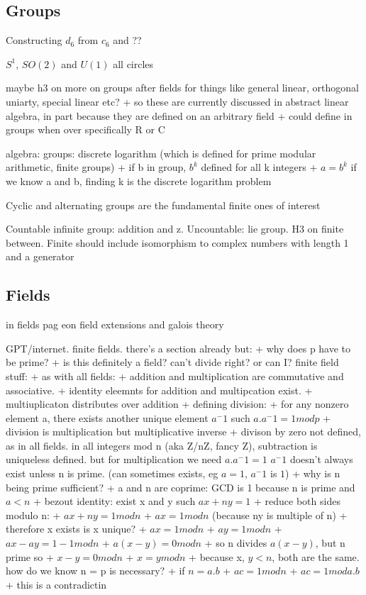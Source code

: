 
\subsection{Groups}
Constructing \(d_6\) from \(c_6\) and ??

\(S^1\), \(SO(2)\) and \(U(1)\) all circles


maybe h3 on more on groups after fields for things like general linear, orthogonal uniarty, special linear etc?
+ so these are currently discussed in abstract linear algebra, in part because they are defined on an arbitrary field
+ could define in groups when over specifically R or C

algebra: groups: discrete logarithm (which is defined for prime modular arithmetic, finite groups)
+ if b in group, \(b^k\) defined for all k integers
+ \(a = b^k\)
if we know a and b, finding k is the discrete logarithm problem

Cyclic and alternating groups are the fundamental finite ones of interest

Countable infinite group: addition and z. Uncountable: lie group.
H3 on finite between. Finite should include isomorphism to complex numbers with length 1 and a generator

\subsection{Fields}
in fields
	pag eon field extensions and galois theory

GPT/internet. finite fields. there's a section already but:
+ why does p have to be prime?
+ is this definitely a field? can't divide right? or can I?
finite field stuff:
+ as with all fields:
+ addition and multiplication are commutative and associative.
+ identity eleemnts for addition and multipcation exist.
+ multiuplicaton distributes over addition
+ defining division:
+ for any nonzero element a, there exists another unique element \(a^-1\) such \(a.a^-1 = 1 mod p\)
+ division is multiplication but multiplicative inverse
+ divison by zero not defined, as in all fields.
in all integers mod n (aka Z/nZ, fancy Z), subtraction is uniqueless defined.
but for multiplication we need \(a.a^-1=1\)
\(a^-1\) doesn't always exist unless n is prime. (can sometimes exists, eg \(a=1\), \(a^-1\) is \(1\))
+ why is n being prime sufficient?
+ a and n are coprime: GCD is 1 because n is prime and \(a < n\)
+ bezout identity: exist x and y such \(ax+ny=1\)
+ reduce both sides modulo n:
+ \(ax+ny=1 mod n\)
+ \(ax = 1 mod n\) (because ny is multiple of n)
+ therefore x exists
is x unique?
+ \(ax=1 mod n\)
+ \(ay=1 mod n\)
+ \(ax-ay=1-1 mod n\)
+ \(a(x-y)= 0 mod n\)
+ so n divides \(a(x-y)\), but n prime so
+ \(x-y = 0 mod n\)
+ \(x=y mod n\)
+ because x, \(y < n\), both are the same.
how do we know n = p is necessary?
+ if \(n = a.b\)
+ \(ac=1 mod n\)
+ \(ac=1 mod a.b\)
+ this is a contradictin


